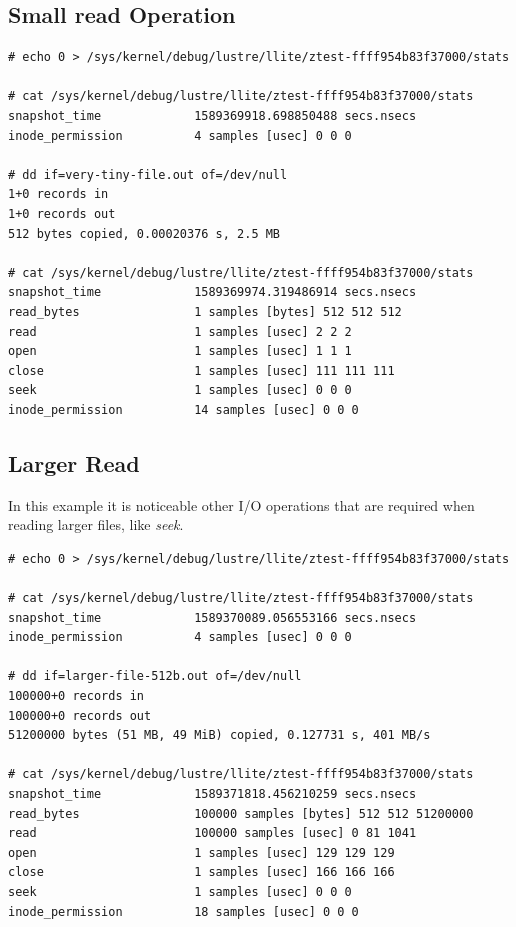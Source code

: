 \documentclass{article}
\begin{document}
\subsection{Small read Operation}
\begin{verbatim}
# echo 0 > /sys/kernel/debug/lustre/llite/ztest-ffff954b83f37000/stats

# cat /sys/kernel/debug/lustre/llite/ztest-ffff954b83f37000/stats
snapshot_time             1589369918.698850488 secs.nsecs
inode_permission          4 samples [usec] 0 0 0

# dd if=very-tiny-file.out of=/dev/null
1+0 records in
1+0 records out
512 bytes copied, 0.00020376 s, 2.5 MB

# cat /sys/kernel/debug/lustre/llite/ztest-ffff954b83f37000/stats
snapshot_time             1589369974.319486914 secs.nsecs
read_bytes                1 samples [bytes] 512 512 512
read                      1 samples [usec] 2 2 2
open                      1 samples [usec] 1 1 1
close                     1 samples [usec] 111 111 111
seek                      1 samples [usec] 0 0 0
inode_permission          14 samples [usec] 0 0 0
\end{verbatim}

\subsection{Larger Read}
In this example it is noticeable other I/O operations that are required when reading larger files, like \textit{seek}.

\begin{verbatim}
# echo 0 > /sys/kernel/debug/lustre/llite/ztest-ffff954b83f37000/stats

# cat /sys/kernel/debug/lustre/llite/ztest-ffff954b83f37000/stats
snapshot_time             1589370089.056553166 secs.nsecs
inode_permission          4 samples [usec] 0 0 0

# dd if=larger-file-512b.out of=/dev/null
100000+0 records in
100000+0 records out
51200000 bytes (51 MB, 49 MiB) copied, 0.127731 s, 401 MB/s

# cat /sys/kernel/debug/lustre/llite/ztest-ffff954b83f37000/stats
snapshot_time             1589371818.456210259 secs.nsecs
read_bytes                100000 samples [bytes] 512 512 51200000
read                      100000 samples [usec] 0 81 1041
open                      1 samples [usec] 129 129 129
close                     1 samples [usec] 166 166 166
seek                      1 samples [usec] 0 0 0
inode_permission          18 samples [usec] 0 0 0
    
\end{verbatim}
\end{document}
